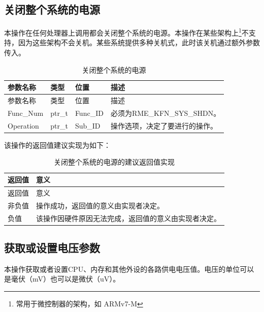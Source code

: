 \subsection{关闭整个系统的电源}\label{subsec:8-power-off-system}

本操作在任何处理器上调用都会关闭整个系统的电源。本操作在某些架构上\footnote{常用于微控制器的架构，如 ARMv7-M}不支持，因为这些架构不会关机。某些系统提供多种关机式，此时该关机通过额外参数传入。

\begin{xltabular}{\textwidth}{@{}>{\hsize\raggedright\arraybackslash}X>{\hsize\raggedright\arraybackslash}X>{\hsize\raggedright\arraybackslash}X>{\hsize\raggedright\arraybackslash}X@{}}
\caption{关闭整个系统的电源}\label{tab:8-47-power-off-system}\\
\toprule
参数名称 & 类型 & 位置 & 描述\tabularnewline
\endfirsthead
\toprule
参数名称 & 类型 & 位置 & 描述\tabularnewline
\midrule
\endhead
\bottomrule
\endlastfoot
Func\_Num & ptr\_t & Func\_ID &
必须为RME\_KFN\_SYS\_SHDN。\tabularnewline
Operation & ptr\_t & Sub\_ID &
操作选项，决定了要进行的操作。\tabularnewline
\end{xltabular}

该操作的返回值建议实现为如下：

\begin{xltabular}{\textwidth}{@{}>{\hsize\raggedright\arraybackslash}X>{\hsize\raggedright\arraybackslash}X@{}}
\caption{关闭整个系统的电源的建议返回值实现}\label{tab:8-48-power-off-system-suggested-return-values}\\
\toprule
返回值 & 意义\tabularnewline
\endfirsthead
\toprule
返回值 & 意义\tabularnewline
\midrule
\endhead
\bottomrule
\endlastfoot
    非负值 & 操作成功，返回值的意义由实现者决定。\tabularnewline
    负值 & 该操作因硬件原因无法完成，返回值的意义由实现者决定。\tabularnewline
\end{xltabular}

\subsection{获取或设置电压参数}\label{subsec:8-get-or-set-voltage}

本操作获取或者设置CPU、内存和其他外设的各路供电电压值。电压的单位可以是毫伏（mV）也可以是微伏（uV）。

